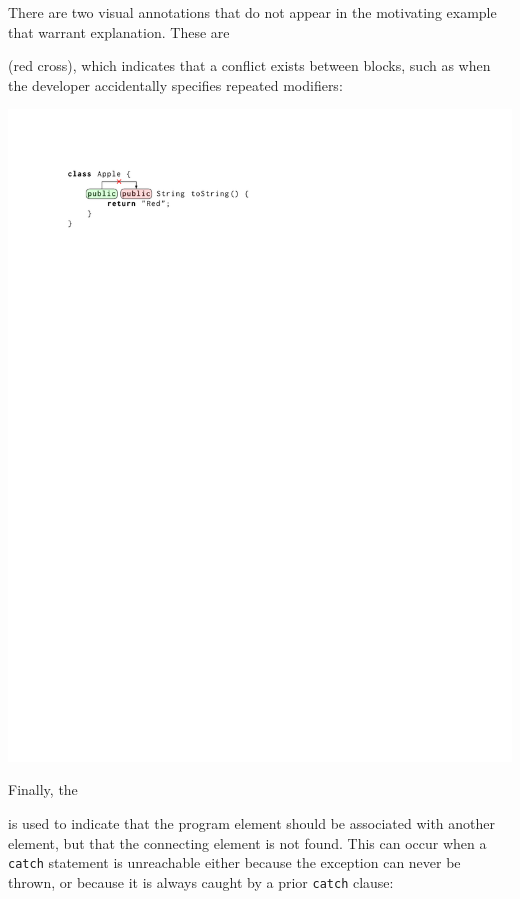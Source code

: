 \documentclass[conference]{IEEEtran}
\begin{document}
There are two visual annotations that do not appear in the motivating example that warrant explanation. These are  (red cross), which indicates that a conflict exists between blocks, such as when the developer accidentally specifies repeated modifiers:

\includegraphics{apple_explain_crop.pdf}

Finally, the  is used to indicate that the program element should be associated with another element, but that the connecting element is not found. This can occur when a \texttt{catch} statement is unreachable either because the exception can never be thrown, or because it is always caught by a prior \texttt{catch} clause:
\end{document}
